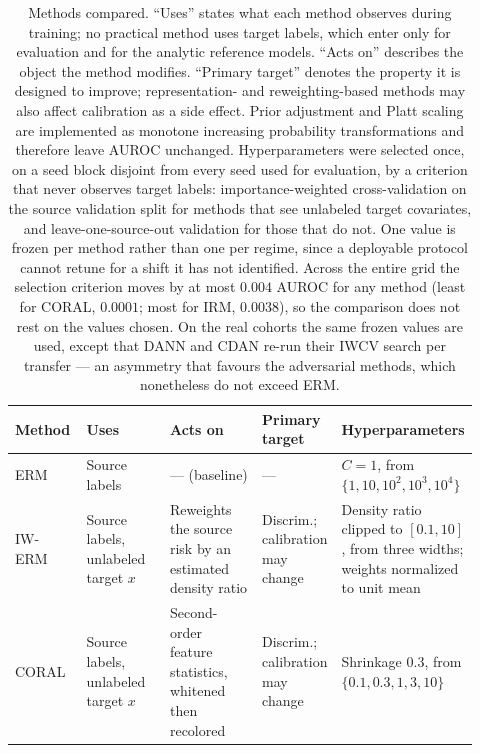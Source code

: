 \begin{table}[t]
\caption{Methods compared. ``Uses'' states what each method observes during
training; no practical method uses target labels, which enter only for
evaluation and for the analytic reference models. ``Acts on'' describes the
object the method modifies. ``Primary target'' denotes the property it is
designed to improve; representation- and reweighting-based methods may also
affect calibration as a side effect. Prior adjustment and Platt scaling are
implemented as monotone increasing probability transformations and therefore
leave AUROC unchanged. Hyperparameters were selected once, on a seed block
disjoint from every seed used for evaluation, by a criterion that never
observes target labels: importance-weighted cross-validation on the source
validation split for methods that see unlabeled target covariates, and
leave-one-source-out validation for those that do not. One value is frozen per
method rather than one per regime, since a deployable protocol cannot retune
for a shift it has not identified. Across the entire grid the selection
criterion moves by at most $0.004$ AUROC for any method (least for CORAL,
$0.0001$; most for IRM, $0.0038$), so the comparison does not rest on the
values chosen. On the real cohorts the same frozen values are used, except that
DANN and CDAN re-run their IWCV search per transfer --- an asymmetry that
favours the adversarial methods, which nonetheless do not exceed ERM.}
\label{tab:methods}
\centering
\footnotesize
\setlength{\tabcolsep}{5pt}
\renewcommand{\arraystretch}{1.25}
\begin{tabular}{@{}p{0.12\linewidth}p{0.20\linewidth}p{0.23\linewidth}p{0.16\linewidth}p{0.21\linewidth}@{}}
\toprule
\textbf{Method} & \textbf{Uses} & \textbf{Acts on} &
\textbf{Primary target} & \textbf{Hyperparameters} \\
\midrule

ERM & Source labels &
--- (baseline) & --- &
$C = 1$, from $\{1, 10, 10^2, 10^3, 10^4\}$ \\

IW-ERM~\cite{shimodaira2000improving} & Source labels, unlabeled target $x$ &
Reweights the source risk by an estimated density ratio &
Discrim.; calibration may change &
Density ratio clipped to $[0.1, 10]$, from three widths; weights normalized to
unit mean \\

CORAL~\cite{sun2016deep} & Source labels, unlabeled target $x$ &
Second-order feature statistics, whitened then recolored &
Discrim.; calibration may change &
Shrinkage $0.3$, from $\{0.1, 0.3, 1, 3, 10\}$ \\


\end{tabular}
\end{table}
